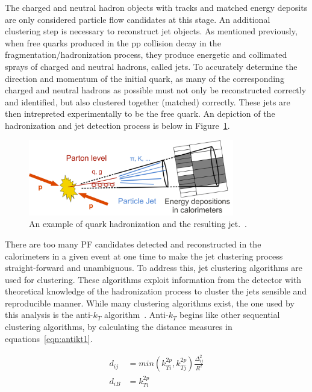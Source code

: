 The charged and neutral hadron objects with tracks and matched energy deposits are only considered particle flow candidates at this stage.
An additional clustering step is necessary to reconstruct jet objects. As mentioned previously, when free quarks produced in the pp collision decay in the
fragmentation/hadronization process, they produce energetic and collimated sprays of charged
and neutral hadrons, called jets. To accurately determine the direction and momentum of the initial quark, as many of the corresponding charged and neutral hadrons as possible must not only be
reconstructed correctly and identified, but also clustered together (matched) correctly.
These jets are then intrepreted experimentally to be the free quark. An depiction of the hadronization and jet detection process is below in Figure~\ref{fig:frag}.

\begin{figure}[hbtp]
 \begin{center}
   \includegraphics[width=0.8\textwidth]{ch4_figs/jet_frag.pdf}
   \caption[Jet hadronization example]{An example of quark hadronization and the resulting jet.~\cite{frag}.}
   \label{fig:frag}
 \end{center}
\end{figure}
 
There are too many PF candidates detected and reconstructed in the calorimeters in a given event at one time to make the jet clustering process straight-forward
and unambiguous. To address this, jet clustering algorithms are used for clustering. These algorithms exploit information from the detector with theoretical knowledge of the
hadronization process to cluster the jets sensible and reproducible manner.
While many clustering algorithms exist, the one used by this analysis is the anti-$k_{T}$ algorithm~\cite{antikt}. Anti-$k_{T}$ begins like other sequential clustering algorithms,
by calculating the distance measures in equations~\ref{eqn:antikt1}. 

\begin{equation}
\begin{aligned}
\label{eqn:antikt1}
d_{ij} &= min(k^{2p}_{Ti},k^{2p}_{Tj})\frac{\Delta_{ij}^{2}}{R^{2}} \\ d_{iB} &= k^{2p}_{Ti}
\end{aligned} 
\end{equation}

